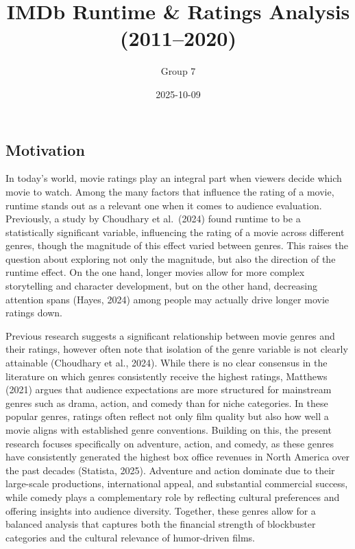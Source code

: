 \documentclass[
]{article}
\title{IMDb Runtime \& Ratings Analysis (2011--2020)}
\author{Group 7}
\date{2025-10-09}
\begin{document}
\maketitle

{
\setcounter{tocdepth}{2}
\tableofcontents
}
\subsection{Motivation}\label{motivation}

In today's world, movie ratings play an integral part when viewers
decide which movie to watch. Among the many factors that influence the
rating of a movie, runtime stands out as a relevant one when it comes to
audience evaluation. Previously, a study by Choudhary et al.~(2024)
found runtime to be a statistically significant variable, influencing
the rating of a movie across different genres, though the magnitude of
this effect varied between genres. This raises the question about
exploring not only the magnitude, but also the direction of the runtime
effect. On the one hand, longer movies allow for more complex
storytelling and character development, but on the other hand,
decreasing attention spans (Hayes, 2024) among people may actually drive
longer movie ratings down.

Previous research suggests a significant relationship between movie
genres and their ratings, however often note that isolation of the genre
variable is not clearly attainable (Choudhary et al., 2024). While there
is no clear consensus in the literature on which genres consistently
receive the highest ratings, Matthews (2021) argues that audience
expectations are more structured for mainstream genres such as drama,
action, and comedy than for niche categories. In these popular genres,
ratings often reflect not only film quality but also how well a movie
aligns with established genre conventions. Building on this, the present
research focuses specifically on adventure, action, and comedy, as these
genres have consistently generated the highest box office revenues in
North America over the past decades (Statista, 2025). Adventure and
action dominate due to their large-scale productions, international
appeal, and substantial commercial success, while comedy plays a
complementary role by reflecting cultural preferences and offering
insights into audience diversity. Together, these genres allow for a
balanced analysis that captures both the financial strength of
blockbuster categories and the cultural relevance of humor-driven films.
\end{document}
